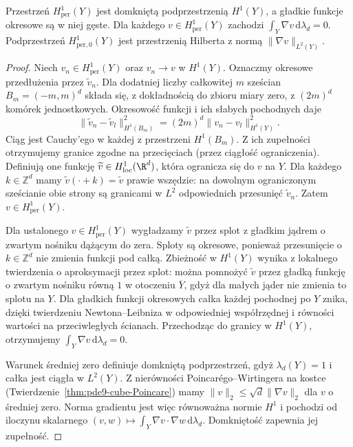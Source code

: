 \begin{lemat}
\label{lem:pde30-periodic-H1}
Przestrzeń $H^1_{\mathrm{per}}(Y)$ jest domkniętą
podprzestrzenią $H^1(Y)$, a gładkie funkcje okresowe
są w niej gęste. Dla każdego $v\in H^1_{\mathrm{per}}(Y)$
zachodzi $\int_Y\nabla v\,\mathrm d\lambda_d=0$.
Podprzestrzeń $H^1_{\mathrm{per},0}(Y)$ jest przestrzenią
Hilberta z normą $\|\nabla v\|_{L^2(Y)}$.
\end{lemat}
\begin{proof}
Niech $v_n\in H^1_{\mathrm{per}}(Y)$ oraz
$v_n\to v$ w $H^1(Y)$.
Oznaczmy okresowe przedłużenia przez $\widetilde v_n$.
Dla dodatniej liczby całkowitej $m$ sześcian
$B_m=(-m,m)^d$ składa się, z dokładnością
do zbioru miary zero, z $(2m)^d$ komórek jednostkowych.
Okresowość funkcji i ich słabych pochodnych daje
\[
 \|\widetilde v_n-\widetilde v_l\|_{H^1(B_m)}^2
 =(2m)^d\|v_n-v_l\|_{H^1(Y)}^2.
\]
Ciąg jest Cauchy'ego w każdej z przestrzeni $H^1(B_m)$.
Z ich zupełności otrzymujemy granice zgodne na
przecięciach (przez ciągłość ograniczenia).
Definiują one funkcję $\widetilde v\in H^1_{\mathrm{loc}}(\R^d)$,
która ogranicza się do $v$ na $Y$.
Dla każdego $k\in\mathbb Z^d$ mamy
$\widetilde v(\cdot+k)=\widetilde v$ prawie wszędzie:
na dowolnym ograniczonym sześcianie obie strony
są granicami w $L^2$ odpowiednich przesunięć
$\widetilde v_n$. Zatem $v\in H^1_{\mathrm{per}}(Y)$.

Dla ustalonego $v\in H^1_{\mathrm{per}}(Y)$
wygładzamy $\widetilde v$ przez splot z gładkim
jądrem o zwartym nośniku dążącym do zera.
Sploty są okresowe, ponieważ przesunięcie o
$k\in\mathbb Z^d$ nie zmienia funkcji pod całką.
Zbieżność w $H^1(Y)$ wynika z lokalnego
twierdzenia o aproksymacji przez splot:
można pomnożyć $\widetilde v$ przez gładką
funkcję o zwartym nośniku równą $1$ w otoczeniu
$\overline Y$, gdyż dla małych jąder nie zmienia
to splotu na $Y$. Dla gładkich funkcji okresowych
całka każdej pochodnej po $Y$ znika, dzięki
twierdzeniu Newtona--Leibniza w odpowiedniej
współrzędnej i równości wartości na przeciwległych
ścianach. Przechodząc do granicy w $H^1(Y)$,
otrzymujemy $\int_Y\nabla v\,\mathrm d\lambda_d=0$.

Warunek średniej zero definiuje domkniętą
podprzestrzeń, gdyż $\lambda_d(Y)=1$ i całka
jest ciągła w $L^2(Y)$. Z nierówności
Poincarégo--Wirtingera na kostce
(Twierdzenie~\ref{thm:pde9-cube-Poincare})
mamy $\|v\|_2\le\sqrt d\|\nabla v\|_2$ dla
$v$ o średniej zero. Norma gradientu jest więc
równoważna normie $H^1$ i pochodzi od iloczynu
skalarnego $(v,w)\mapsto\int_Y\nabla v\cdot\nabla w\,
\mathrm d\lambda_d$. Domkniętość zapewnia jej zupełność.
\end{proof}

